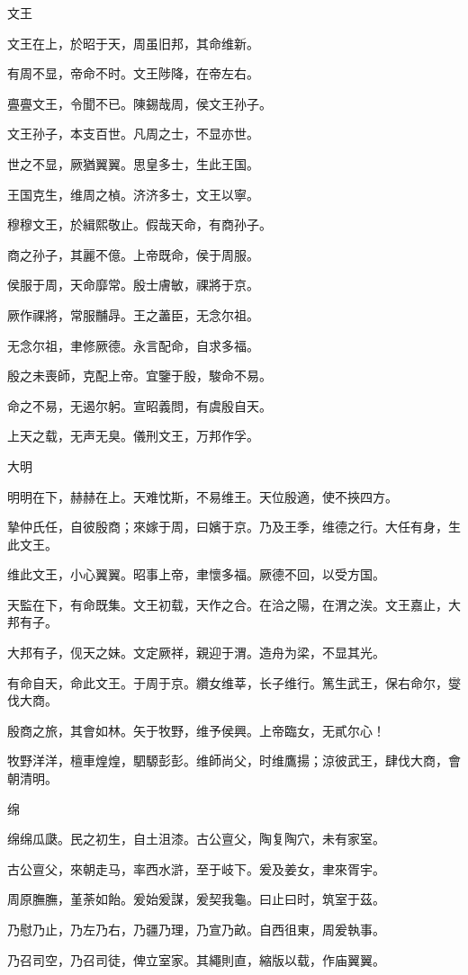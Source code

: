 文王

文王在上，於昭于天，周虽旧邦，其命维新。

有周不显，帝命不时。文王陟降，在帝左右。

亹亹文王，令聞不已。陳錫哉周，侯文王孙子。

文王孙子，本支百世。凡周之士，不显亦世。

世之不显，厥猶翼翼。思皇多士，生此王国。

王国克生，维周之楨。济济多士，文王以寧。

穆穆文王，於緝熙敬止。假哉天命，有商孙子。

商之孙子，其麗不億。上帝既命，侯于周服。

侯服于周，天命靡常。殷士膚敏，祼將于京。

厥作祼將，常服黼冔。王之藎臣，无念尔祖。

无念尔祖，聿修厥德。永言配命，自求多福。

殷之未喪師，克配上帝。宜鑒于殷，駿命不易。

命之不易，无遏尔躬。宣昭義問，有虞殷自天。

上天之载，无声无臭。儀刑文王，万邦作孚。

大明

明明在下，赫赫在上。天难忱斯，不易维王。天位殷適，使不挾四方。

摯仲氏任，自彼殷商；來嫁于周，曰嬪于京。乃及王季，维德之行。大任有身，生此文王。

维此文王，小心翼翼。昭事上帝，聿懷多福。厥德不回，以受方国。

天監在下，有命既集。文王初载，天作之合。在洽之陽，在渭之涘。文王嘉止，大邦有子。

大邦有子，伣天之妹。文定厥祥，親迎于渭。造舟为梁，不显其光。

有命自天，命此文王。于周于京。纘女维莘，长子维行。篤生武王，保右命尔，燮伐大商。

殷商之旅，其會如林。矢于牧野，维予侯興。上帝臨女，无貳尔心！

牧野洋洋，檀車煌煌，駟騵彭彭。维師尚父，时维鷹揚；涼彼武王，肆伐大商，會朝清明。

绵

绵绵瓜瓞。民之初生，自土沮漆。古公亶父，陶复陶穴，未有家室。

古公亶父，來朝走马，率西水滸，至于岐下。爰及姜女，聿來胥宇。

周原膴膴，堇荼如飴。爰始爰謀，爰契我龜。曰止曰时，筑室于茲。

乃慰乃止，乃左乃右，乃疆乃理，乃宣乃畝。自西徂東，周爰執事。

乃召司空，乃召司徒，俾立室家。其繩則直，縮版以载，作庙翼翼。

